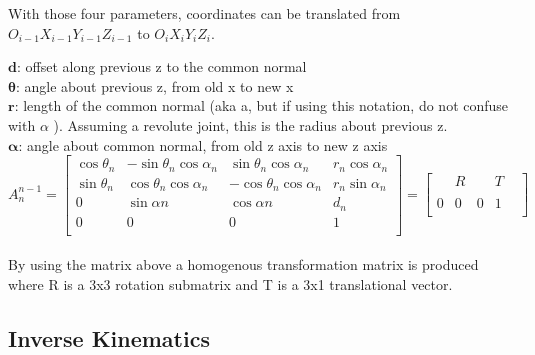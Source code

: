 \documentclass{UoNMCHA}
\numberwithin{equation}{section}
\begin{document}
	With those four parameters, coordinates can be translated from $O_{i-1}X_{i-1}Y_{i-1}Z_{i-1}$ to $O_iX_iY_iZ_i$.
	
	$\mathbf{d}$: offset along previous z to the common normal \\
	$\mathbf{\theta}$: angle about previous z, from old x to new x\\
	$\mathbf{r}$: length of the common normal (aka a, but if using this notation, do not confuse with $\alpha$ ). Assuming a revolute joint, this is the radius about previous z.\\
	$\mathbf{\alpha}$: angle about common normal, from old z axis to new z axis\\
	
	
	\begin{equation} \label{eq/denavit}
	A_{n}^{n-1} = 
	\begin{bmatrix}
	\cos{\theta_{n}} & -\sin{\theta_{n}} \cos{\alpha_{n}} & \sin{\theta_{n}} \cos{\alpha_{n}} & r_{n} \cos{\alpha_{n}} \\ 
	\sin{\theta_{n}} & \cos{\theta_{n}} \cos{\alpha_{n}} & -\cos{\theta_{n}} \cos{\alpha_{n}} & r_{n} \sin	{\alpha_{n}} \\
	0 & \sin{\alpha{n}} & \cos{\alpha{n}} & d_n \\
	0 & 0 & 0 & 1 \\ 
	\end{bmatrix} =
	\begin{bmatrix}
	& R &  & T \\
	& & & & \\	
	0 & 0 & 0 & 1 \\
	\end{bmatrix}
	\end{equation}
	\\
	
	By using the matrix above a homogenous transformation matrix is produced where R is a 3x3 rotation submatrix and T is a 3x1 translational vector. 
	
	\newpage
	\subsection{Inverse Kinematics}
	
\end{document}

